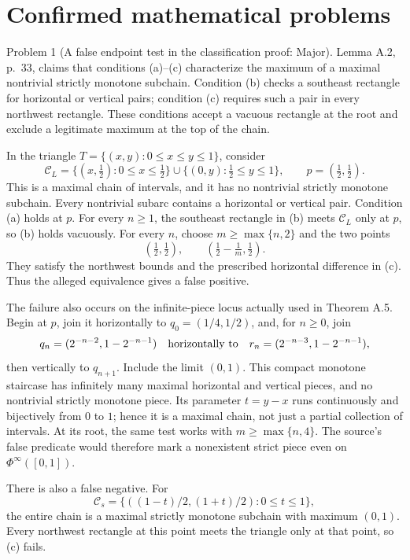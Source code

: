 \documentclass[10pt]{article}
\begin{document}
\section*{Confirmed mathematical problems}
Problem 1 (A false endpoint test in the classification proof: Major).  Lemma A.2, p. 33, claims that conditions (a)–(c) characterize the maximum of a maximal nontrivial strictly monotone subchain. Condition (b) checks a southeast rectangle for horizontal or vertical pairs; condition (c) requires such a pair in every northwest rectangle. These conditions accept a vacuous rectangle at the root and exclude a legitimate maximum at the top of the chain.\par
In the triangle \(T=\{(x,y):0\leq x\leq y\leq1\}\), consider \[\mathcal C_L=\{(x,\tfrac12):0\leq x\leq\tfrac12\}
       \cup\{(0,y):\tfrac12\leq y\leq1\},\qquad
 p=(\tfrac12,\tfrac12).\] This is a maximal chain of intervals, and it has no nontrivial strictly monotone subchain. Every nontrivial subarc contains a horizontal or vertical pair. Condition (a) holds at \(p\). For every \(n\geq1\), the southeast rectangle in (b) meets \(\mathcal C_L\) only at \(p\), so (b) holds vacuously. For every \(n\), choose \(m\geq\max\{n,2\}\) and the two points \[(\tfrac12,\tfrac12),\qquad
 (\tfrac12-\tfrac1m,\tfrac12).\] They satisfy the northwest bounds and the prescribed horizontal difference in (c). Thus the alleged equivalence gives a false positive.\par
The failure also occurs on the infinite-piece locus actually used in Theorem A.5. Begin at \(p\), join it horizontally to \(q_0=(1/4,1/2)\), and, for \(n\geq0\), join \[q_n=(2^{-n-2},1-2^{-n-1})
 \quad\hbox{horizontally to}\quad
 r_n=(2^{-n-3},1-2^{-n-1}),\] then vertically to \(q_{n+1}\). Include the limit \((0,1)\). This compact monotone staircase has infinitely many maximal horizontal and vertical pieces, and no nontrivial strictly monotone piece. Its parameter \(t=y-x\) runs continuously and bijectively from \(0\) to \(1\); hence it is a maximal chain, not just a partial collection of intervals. At its root, the same test works with \(m\geq\max\{n,4\}\). The source’s false predicate would therefore mark a nonexistent strict piece even on \(\Phi^\infty([0,1])\).\par
There is also a false negative. For \[\mathcal C_s=\{((1-t)/2,(1+t)/2):0\leq t\leq1\},\] the entire chain is a maximal strictly monotone subchain with maximum \((0,1)\). Every northwest rectangle at this point meets the triangle only at that point, so (c) fails.\par
\end{document}
